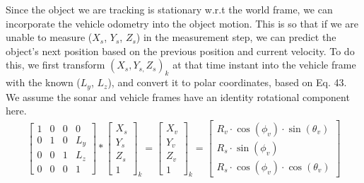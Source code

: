 \documentclass[a4paper]{IEEEtran}
\newcommand{\XSonar}{$\si{\textit{X}_{s}}$\xspace}
\newcommand{\YSonar}{$\si{\textit{Y}_{s}}$\xspace}
\newcommand{\ZSonar}{$\si{\textit{Z}_{s}}$\xspace}
\begin{document}
Since the object we are tracking is stationary w.r.t the world frame, we can incorporate the vehicle odometry into the object motion. This is so that if we are unable to measure (\XSonar, \YSonar, \ZSonar) in the measurement step, we can predict the object's next position based on the previous position and current velocity. To do this, we first transform $(X_{s},Y_{s,}Z_{s})_{k}$ at that time instant into the vehicle frame with the known ($L_{y}$, $L_{z}$), and convert it to polar coordinates, based on Eq. 43. We assume the sonar and vehicle frames have an identity rotational component here. 
\begingroup\makeatletter\def\f@size{7}\check@mathfonts
\begin{gather}
\left[\begin{array}{cccc}
1 & 0 & 0 & 0\\
0 & 1 & 0 & L_{y}\\
0 & 0 & 1 & L_{z}\\
0 & 0 & 0 & 1
\end{array}\right]*\left[\begin{array}{c}
X_{s}\\
Y_{s}\\
Z_{s}\\
1
\end{array}\right]_{k}=\left[\begin{array}{c}
X_{v}\\
Y_{v}\\
Z_{v}\\
1
\end{array}\right]_{k}=\left[\begin{array}{c}
R_{v}\cdot\cos\left(\phi_{v}\right)\cdot\sin\left(\theta_{v}\right)\\
R_{s}\cdot\sin\left(\phi_{v}\right)\\
R_{s}\cdot\cos\left(\phi_{v}\right)\cdot\cos\left(\theta_{v}\right)
\end{array}\right]
\end{gather}
\endgroup 
\end{document}
